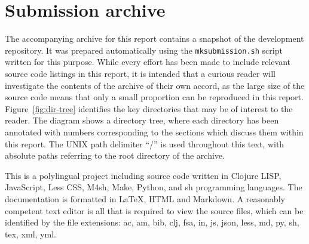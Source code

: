 


\newpage
\section*{Submission archive}
The accompanying archive for this report contains a snapshot of the
development repository. It was prepared automatically using the
\texttt{mksubmission.sh} script written for this purpose. While every
effort has been made to include relevant source code listings in this
report, it is intended that a curious reader will investigate the
contents of the archive of their own accord, as the large size of the
source code means that only a small proportion can be reproduced in
this report. Figure~\ref{fig:dir-tree} identifies the key directories
that may be of interest to the reader. The diagram shows a directory
tree, where each directory has been annotated with numbers
corresponding to the sections which discuss them within this
report. The UNIX path delimiter ``/'' is used throughout this text,
with absolute paths referring to the root directory of the archive.

This is a polylingual project including source code written in Clojure
LISP, JavaScript, Less CSS, M4sh, Make, Python, and sh programming
languages. The documentation is formatted in \LaTeX, HTML and
Markdown. A reasonably competent text editor is all that is required
to view the source files, which can be identified by the file
extensions: ac, am, bib, clj, fsa, in, js, json, less, md, py, sh,
tex, xml, yml.


